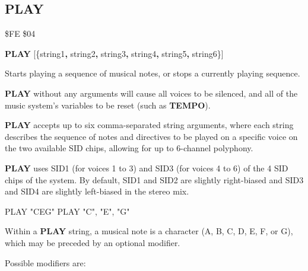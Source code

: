 \subsection{PLAY}
\begin{description}[leftmargin=2cm,style=nextline]
\item [Token:]    \$FE \$04

\item [Format:]   {\bf PLAY} [\{string1{\bf,} string2{\bf,} string3{\bf,} string4{\bf,} string5{\bf,} string6\}]

\item [Usage:]    Starts playing a sequence of musical notes, or stops a currently playing sequence.

                  {\bf PLAY} without any arguments will cause all voices to be silenced, and all of the music system's variables to be reset (such as {\bf TEMPO}).

                  {\bf PLAY} accepts up to six comma-separated string arguments, where each string describes the sequence of notes and directives to be played on a specific voice on the two available SID chips, allowing for up to 6-channel polyphony.

                  {\bf PLAY} uses SID1 (for voices 1 to 3) and SID3 (for voices 4 to 6) of the 4 SID chips of the system. By default, SID1 and SID2 are slightly right-biased and SID3 and SID4 are slightly left-biased in the stereo mix.

\begin{screencode}
PLAY "CEG"
PLAY "C", "E", "G"
\end{screencode}

                  Within a {\bf PLAY} string, a musical note is a character (A, B, C, D, E, F, or G), which may be preceded by an optional modifier.

                  Possible modifiers are:


\end{description}
